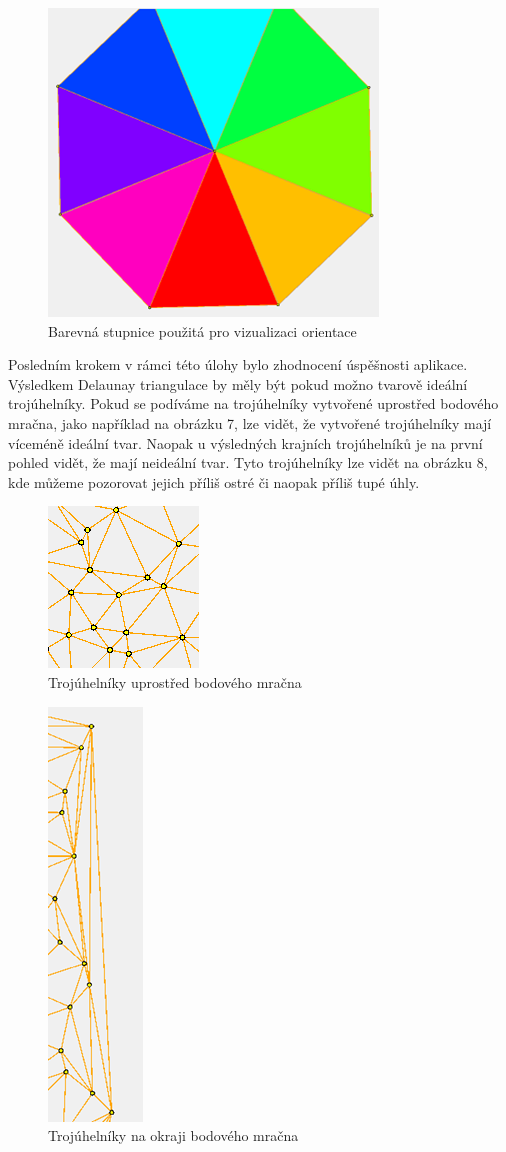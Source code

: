 \documentclass{article}
\begin{document}
\begin{spacing}{1.5}
\begin{figure}[htbp]
    \centering
    \includegraphics[width=0.3\linewidth]{images/06barvy.png}
    \caption{Barevná stupnice použitá pro vizualizaci orientace}
    \label{fig:enter-label}
\end{figure}

\newpage
Posledním krokem v rámci této úlohy bylo zhodnocení úspěšnosti aplikace. Výsledkem Delaunay triangulace by měly být pokud možno tvarově ideální trojúhelníky. Pokud se podíváme na trojúhelníky vytvořené uprostřed bodového mračna, jako například na obrázku 7, lze vidět, že vytvořené trojúhelníky mají víceméně ideální tvar. Naopak u výsledných krajních trojúhelníků je na první pohled vidět, že mají neideální tvar. Tyto trojúhelníky lze vidět na obrázku 8, kde můžeme pozorovat jejich příliš ostré či naopak příliš tupé úhly.

\begin{figure}[htbp]
    \centering
    \includegraphics[width=0.2\linewidth]{images/07trojuhelnik.png}
    \caption{Trojúhelníky uprostřed bodového mračna}
    \label{fig:enter-label}
\end{figure}

\begin{figure}[htbp]
    \centering
    \includegraphics[width=0.1\linewidth]{images/08trojuhelnik_okraj.png}
    \caption{Trojúhelníky na okraji bodového mračna}
    \label{fig:enter-label}
\end{figure}


\end{spacing}
\end{document}
